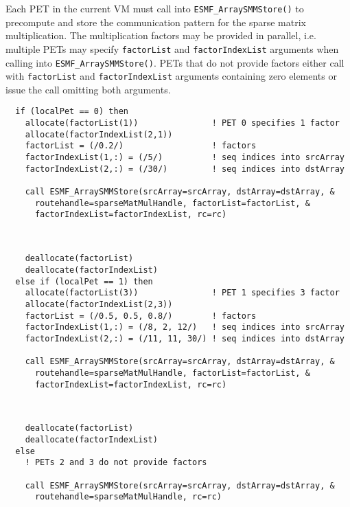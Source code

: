    Each PET in the current VM must call into {\tt ESMF\_ArraySMMStore()}
   to precompute and store the communication pattern for the sparse matrix
   multiplication. The multiplication factors may be provided in parallel, i.e.
   multiple PETs may specify {\tt factorList} and {\tt factorIndexList} arguments
   when calling into {\tt ESMF\_ArraySMMStore()}. PETs that do not
   provide factors either call with {\tt factorList} and {\tt factorIndexList}
   arguments containing zero elements or issue the call omitting both arguments. 

 \begin{verbatim}
  if (localPet == 0) then
    allocate(factorList(1))               ! PET 0 specifies 1 factor
    allocate(factorIndexList(2,1))
    factorList = (/0.2/)                  ! factors
    factorIndexList(1,:) = (/5/)          ! seq indices into srcArray
    factorIndexList(2,:) = (/30/)         ! seq indices into dstArray
    
    call ESMF_ArraySMMStore(srcArray=srcArray, dstArray=dstArray, &
      routehandle=sparseMatMulHandle, factorList=factorList, &
      factorIndexList=factorIndexList, rc=rc)
 
\end{verbatim}
 

 \begin{verbatim}
      
    deallocate(factorList)
    deallocate(factorIndexList)
  else if (localPet == 1) then
    allocate(factorList(3))               ! PET 1 specifies 3 factor
    allocate(factorIndexList(2,3))
    factorList = (/0.5, 0.5, 0.8/)        ! factors
    factorIndexList(1,:) = (/8, 2, 12/)   ! seq indices into srcArray
    factorIndexList(2,:) = (/11, 11, 30/) ! seq indices into dstArray
    
    call ESMF_ArraySMMStore(srcArray=srcArray, dstArray=dstArray, &
      routehandle=sparseMatMulHandle, factorList=factorList, &
      factorIndexList=factorIndexList, rc=rc)
 
\end{verbatim}
 

 \begin{verbatim}
      
    deallocate(factorList)
    deallocate(factorIndexList)
  else
    ! PETs 2 and 3 do not provide factors
    
    call ESMF_ArraySMMStore(srcArray=srcArray, dstArray=dstArray, &
      routehandle=sparseMatMulHandle, rc=rc)
 
\end{verbatim}
 
